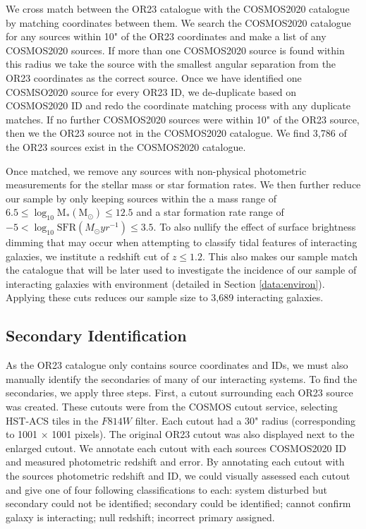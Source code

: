 We cross match between the OR23 catalogue with the COSMOS2020 catalogue by matching coordinates between them. We search the COSMOS2020 catalogue for any sources within 10" of the OR23 coordinates and make a list of any COSMOS2020 sources. If more than one COSMOS2020 source is found within this radius we take the source with the smallest angular separation from the OR23 coordinates as the correct source. Once we have identified one COSMSO2020 source for every OR23 ID, we de-duplicate based on COSMOS2020 ID and redo the coordinate matching process with any duplicate matches. If no further COSMOS2020 sources were within 10" of the OR23 source, then we the OR23 source not in the COSMOS2020 catalogue. We find 3,786 of the OR23 sources exist in the COSMOS2020 catalogue.

Once matched, we remove any sources with non-physical photometric measurements for the stellar mass or star formation rates. We then further reduce our sample by only keeping sources within the a mass range of $6.5 \leq \log_{10} \text{M}_{*}(\text{M}_{\odot}) \leq 12.5$ and a star formation rate range of $-5 < \log_{10} \text{SFR} (M_{\odot}yr^{-1}) \leq 3.5$. To also nullify the effect of surface brightness dimming that may occur when attempting to classify tidal features of interacting galaxies, we institute a redshift cut of $z \leq 1.2$. This also makes our sample match the catalogue that will be later used to investigate the incidence of our sample of interacting galaxies with environment (detailed in Section \ref{data:environ}). Applying these cuts reduces our sample size to 3,689 interacting galaxies.

\subsection{Secondary Identification}\label{sec:sec-ident}
\noindent As the OR23 catalogue only contains source coordinates and IDs, we must also manually identify the secondaries of many of our interacting systems. To find the secondaries, we apply three steps. First, a cutout surrounding each OR23 source was created. These cutouts were from the COSMOS cutout service, selecting HST-ACS tiles in the $F814W$ filter. Each cutout had a 30" radius (corresponding to 1001 $\times$ 1001 pixels). The original OR23 cutout was also displayed next to the enlarged cutout. We annotate each cutout with each sources COSMOS2020 ID and measured photometric redshift and error. By annotating each cutout with the sources photometric redshift and ID, we could visually assessed each cutout and give one of four following classifications to each: system disturbed but secondary could not be identified; secondary could be identified; cannot confirm galaxy is interacting; null redshift; incorrect primary assigned. 

